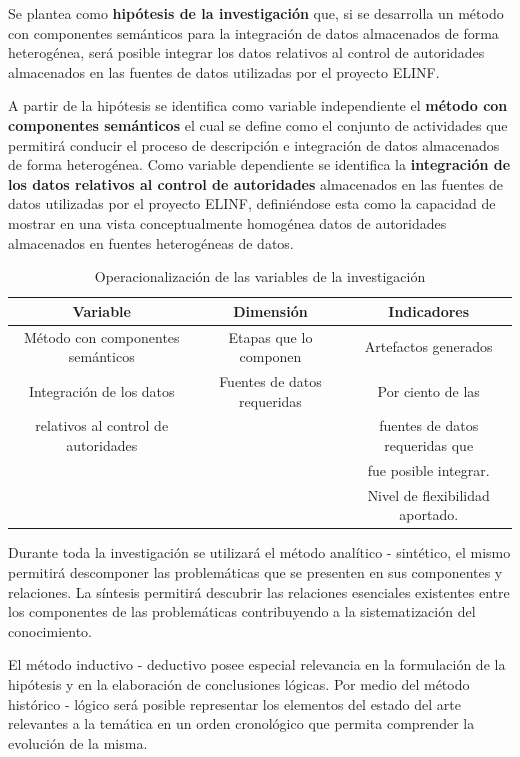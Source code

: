 Se plantea como \textbf{hipótesis de la investigación} que, si se desarrolla un método con componentes semánticos para la integración de datos almacenados de forma heterogénea, será posible integrar los datos relativos al control de autoridades almacenados en las fuentes de datos utilizadas por el proyecto ELINF.

A partir de la hipótesis se identifica como variable independiente el \textbf{método con componentes semánticos} el cual se define como el conjunto de actividades \citep{Offermann2010} que permitirá conducir el proceso de descripción e integración de datos almacenados de forma heterogénea. Como variable dependiente se identifica la \textbf{integración de los datos relativos al control de autoridades} almacenados en las fuentes de datos utilizadas por el proyecto ELINF, definiéndose esta como la capacidad de mostrar en una vista conceptualmente homogénea datos de autoridades almacenados en fuentes heterogéneas de datos.


\begin{table}
\centering
\begin{tabular}{c|c|c}
\hline 
Variable & Dimensión & Indicadores \\ 
\hline 
Método con componentes semánticos & Etapas que lo componen & Artefactos generados \\ 
\hline 
Integración de los datos  & Fuentes de datos requeridas & Por ciento de las \\
relativos al control de autoridades & & fuentes de datos requeridas que  \\ 
 & & fue posible integrar. \\
 & & Nivel de flexibilidad aportado. \\
 \hline
\end{tabular} 
\label{tabla:operacionalizacion}
\caption{Operacionalización de las variables de la investigación}
\end{table}


Durante toda la investigación se utilizará el método analítico - sintético, el mismo permitirá descomponer las problemáticas que se presenten en sus componentes y relaciones. La síntesis permitirá descubrir las relaciones esenciales existentes entre los componentes de las problemáticas contribuyendo a la sistematización del conocimiento. 

El método inductivo - deductivo posee especial relevancia en la formulación de la hipótesis y en la elaboración de conclusiones lógicas. Por medio del método histórico - lógico será posible representar los elementos del estado del arte relevantes a la temática en un orden cronológico que permita comprender la evolución de la misma.

